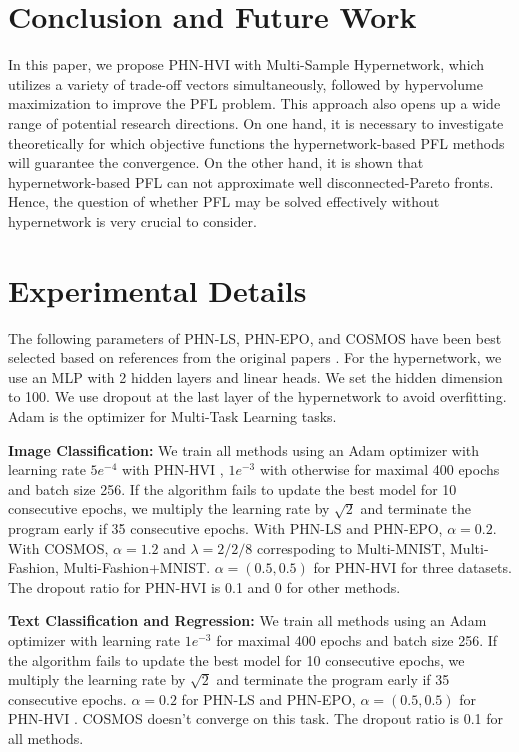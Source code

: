 \documentclass[letterpaper]{article} %
\newcommand{\ourmodel}{PHN-HVI }
\begin{document}
\section{Conclusion and Future Work}
\label{st:6}
In this paper, we propose \ourmodel with Multi-Sample Hypernetwork, which utilizes a variety of trade-off vectors simultaneously, followed by hypervolume maximization to improve the PFL problem. This approach also opens up a wide range of potential research directions. On one hand, it is necessary to investigate theoretically for which objective functions the hypernetwork-based PFL methods will guarantee the convergence. On the other hand, it is shown that hypernetwork-based PFL can not approximate well disconnected-Pareto fronts. Hence, the question of whether PFL may be solved effectively without hypernetwork is very crucial to consider.  

\appendix

\section{Experimental Details}
The following parameters of PHN-LS, PHN-EPO, and COSMOS have been best selected based on references from the original papers \citep{navon2021learning, ruchte2021scalable}. For the hypernetwork, we use an MLP with 2 hidden layers and linear heads. We set the hidden dimension to 100. We use dropout at the last layer of the hypernetwork to avoid overfitting. Adam is the optimizer for Multi-Task Learning tasks.

\textbf{Image Classification:} We train all methods using an Adam optimizer with learning rate $5e^{-4}$ with \ourmodel,  $1e^{-3}$ with otherwise for maximal 400 epochs and batch size 256. If the algorithm fails to update the best model for 10 consecutive epochs, we multiply the learning rate by $\sqrt{2}$ and terminate the program early if 35 consecutive epochs. With PHN-LS and PHN-EPO, $\alpha = 0.2$. With COSMOS, $\alpha=1.2$ and $\lambda = 2/2/8$ correspoding to Multi-MNIST, Multi-Fashion, Multi-Fashion+MNIST. $\alpha = (0.5, 0.5)$ for \ourmodel for three datasets. The dropout ratio for \ourmodel is 0.1 and 0 for other methods.

\textbf{Text Classification and Regression:} We train all methods using an Adam optimizer with learning rate  $1e^{-3}$ for maximal 400 epochs and batch size 256. If the algorithm fails to update the best model for 10 consecutive epochs, we multiply the learning rate by $\sqrt{2}$ and terminate the program early if 35 consecutive epochs. $\alpha = 0.2$ for PHN-LS and PHN-EPO, $\alpha = (0.5, 0.5)$ for \ourmodel. COSMOS doesn't converge on this task. The dropout ratio is 0.1 for all methods.
\end{document}
